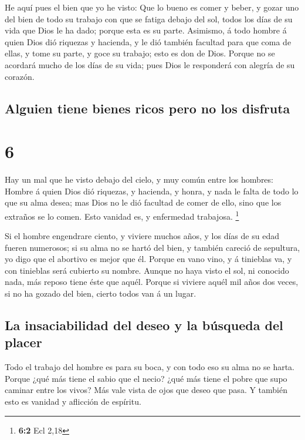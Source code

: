 He aquí pues el bien que yo he visto: Que lo bueno es
comer y beber, y gozar uno del bien de todo su trabajo con que se fatiga
debajo del sol, todos los días de su vida que Dios le ha dado; porque
esta es su parte.  Asimismo, á todo hombre á quien Dios
dió riquezas y hacienda, y le dió también facultad para que coma de
ellas, y tome su parte, y goce su trabajo; esto es don de Dios.
 Porque no se acordará mucho de los días de su vida; pues
Dios le responderá con alegría de su corazón.

\hypertarget{alguien-tiene-bienes-ricos-pero-no-los-disfruta}{%
\subsection{Alguien tiene bienes ricos pero no los
disfruta}\label{alguien-tiene-bienes-ricos-pero-no-los-disfruta}}

\hypertarget{section-5}{%
\section{6}\label{section-5}}

 Hay un mal que he visto debajo del cielo, y muy común
entre los hombres:  Hombre á quien Dios dió riquezas, y
hacienda, y honra, y nada le falta de todo lo que su alma desea; mas
Dios no le dió facultad de comer de ello, sino que los extraños se lo
comen. Esto vanidad es, y enfermedad trabajosa. \footnote{\textbf{6:2}
  Ecl 2,18}

 Si el hombre engendrare ciento, y viviere muchos años, y
los días de su edad fueren numerosos; si su alma no se hartó del bien, y
también careció de sepultura, yo digo que el abortivo es mejor que él.
 Porque en vano vino, y á tinieblas va, y con tinieblas
será cubierto su nombre.  Aunque no haya visto el sol, ni
conocido nada, más reposo tiene éste que aquél.  Porque si
viviere aquél mil años dos veces, si no ha gozado del bien, cierto todos
van á un lugar.

\hypertarget{la-insaciabilidad-del-deseo-y-la-buxfasqueda-del-placer}{%
\subsection{La insaciabilidad del deseo y la búsqueda del
placer}\label{la-insaciabilidad-del-deseo-y-la-buxfasqueda-del-placer}}

 Todo el trabajo del hombre es para su boca, y con todo
eso su alma no se harta.  Porque ¿qué más tiene el sabio
que el necio? ¿qué más tiene el pobre que supo caminar entre los vivos?
 Más vale vista de ojos que deseo que pasa. Y también esto
es vanidad y aflicción de espíritu.

